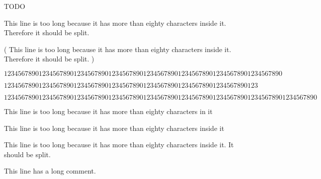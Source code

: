 TODO

This line is too long because it has more than eighty characters inside it. Therefore it should be split.

(
  This line is too long because it has more than eighty characters inside it. Therefore it should be split.
)

\begin{equation}
  1234567890 1234567890 1234567890 1234567890 1234567890 1234567890 1234567890 1234567890
\end{equation}

\begin{equation}
  1234567890 1234567890 1234567890 1234567890 1234567890 1234567890 1234567890 123
\end{equation}

\begin{equation}
  123456789012345678901234567890123456789012345678901234567890123456789012345678901234567890
\end{equation}

This line is too long because it has more than eighty characters in it %

This line is too long because it has more than eighty characters inside it %

This line is too long because it has more than eighty characters inside it. It should be split. %

This line has a long comment. %

